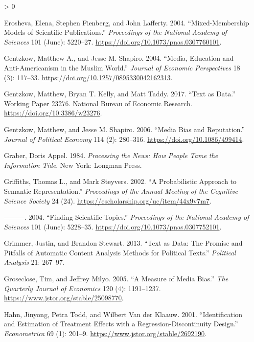 \documentclass[
  12pt,
]{article}
\newlength{\cslhangindent}
\newenvironment{CSLReferences}[2] %
 {%
  \setlength{\parindent}{0pt}
  \ifodd #1 \everypar{\setlength{\hangindent}{\cslhangindent}}\ignorespaces\fi
  \ifnum #2 > 0
  \setlength{\parskip}{#2\baselineskip}
  \fi
 }%
 {}
\begin{document}
\begin{CSLReferences}{1}{0}
\leavevmode\hypertarget{ref-erosheva_mixed-membership_2004}{}%
Erosheva, Elena, Stephen Fienberg, and John Lafferty. 2004.
{``Mixed-Membership Models of Scientific Publications.''}
\emph{Proceedings of the National Academy of Sciences} 101 (June):
5220--27. \url{https://doi.org/10.1073/pnas.0307760101}.

\leavevmode\hypertarget{ref-gentzkow_media_2004}{}%
Gentzkow, Matthew A., and Jesse M. Shapiro. 2004. {``Media, Education
and Anti-Americanism in the Muslim World.''} \emph{Journal of Economic
Perspectives} 18 (3): 117--33.
\url{https://doi.org/10.1257/0895330042162313}.

\leavevmode\hypertarget{ref-gentzkow_text_2017}{}%
Gentzkow, Matthew, Bryan T. Kelly, and Matt Taddy. 2017. {``Text as
Data.''} Working Paper 23276. National Bureau of Economic Research.
\url{https://doi.org/10.3386/w23276}.

\leavevmode\hypertarget{ref-gentzkow_media_2006}{}%
Gentzkow, Matthew, and Jesse M. Shapiro. 2006. {``Media Bias and
Reputation.''} \emph{Journal of Political Economy} 114 (2): 280--316.
\url{https://doi.org/10.1086/499414}.

\leavevmode\hypertarget{ref-graber_processing_1984}{}%
Graber, Doris Appel. 1984. \emph{Processing the News: How People Tame
the Information Tide}. New York: Longman Press.

\leavevmode\hypertarget{ref-griffiths_probabilistic_2002}{}%
Griffiths, Thomas L., and Mark Steyvers. 2002. {``A Probabilistic
Approach to Semantic Representation.''} \emph{Proceedings of the Annual
Meeting of the Cognitive Science Society} 24 (24).
\url{https://escholarship.org/uc/item/44x9v7m7}.

\leavevmode\hypertarget{ref-griffiths_finding_2004}{}%
---------. 2004. {``Finding Scientific Topics.''} \emph{Proceedings of
the National Academy of Sciences} 101 (June): 5228--35.
\url{https://doi.org/10.1073/pnas.0307752101}.

\leavevmode\hypertarget{ref-grimmer_text_2013}{}%
Grimmer, Justin, and Brandon Stewart. 2013. {``Text as Data: The Promise
and Pitfalls of Automatic Content Analysis Methods for Political
Texts.''} \emph{Political Analysis} 21: 267--97.

\leavevmode\hypertarget{ref-groseclose_measure_2005}{}%
Groseclose, Tim, and Jeffrey Milyo. 2005. {``A Measure of Media Bias.''}
\emph{The Quarterly Journal of Economics} 120 (4): 1191--1237.
\url{https://www.jstor.org/stable/25098770}.

\leavevmode\hypertarget{ref-hahn_identification_2001}{}%
Hahn, Jinyong, Petra Todd, and Wilbert Van der Klaauw. 2001.
{``Identification and Estimation of Treatment Effects with a
Regression-Discontinuity Design.''} \emph{Econometrica} 69 (1): 201--9.
\url{https://www.jstor.org/stable/2692190}.


\end{CSLReferences}
\end{document}
